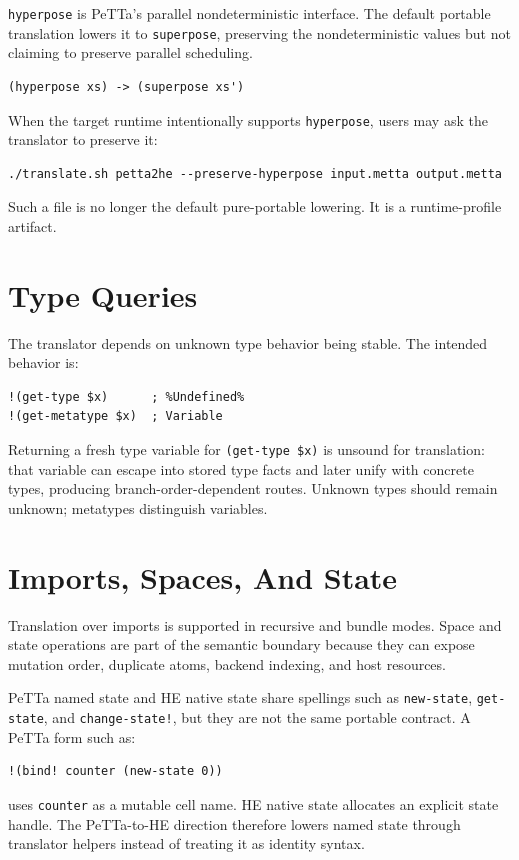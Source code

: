\documentclass[11pt]{article}
\newcommand{\code}[1]{\texttt{#1}}
\newcommand{\HE}{\textup{HE}}
\newcommand{\PeTTa}{\textup{PeTTa}}
\begin{document}
\code{hyperpose} is \PeTTa{}'s parallel nondeterministic interface.  The default
portable translation lowers it to \code{superpose}, preserving the
nondeterministic values but not claiming to preserve parallel scheduling.

\begin{lstlisting}
(hyperpose xs) -> (superpose xs')
\end{lstlisting}

When the target runtime intentionally supports \code{hyperpose}, users may ask
the translator to preserve it:

\begin{lstlisting}
./translate.sh petta2he --preserve-hyperpose input.metta output.metta
\end{lstlisting}

Such a file is no longer the default pure-portable lowering.  It is a
runtime-profile artifact.

\section{Type Queries}

The translator depends on unknown type behavior being stable.  The intended
behavior is:

\begin{lstlisting}
!(get-type $x)      ; %Undefined%
!(get-metatype $x)  ; Variable
\end{lstlisting}

Returning a fresh type variable for \code{(get-type \$x)} is unsound for
translation: that variable can escape into stored type facts and later unify
with concrete types, producing branch-order-dependent routes.  Unknown types
should remain unknown; metatypes distinguish variables.

\section{Imports, Spaces, And State}

Translation over imports is supported in recursive and bundle modes.  Space and
state operations are part of the semantic boundary because they can expose
mutation order, duplicate atoms, backend indexing, and host resources.

\PeTTa{} named state and \HE{} native state share spellings such as
\code{new-state}, \code{get-state}, and \code{change-state!}, but they are not
the same portable contract.  A \PeTTa{} form such as:
\begin{lstlisting}
!(bind! counter (new-state 0))
\end{lstlisting}
uses \code{counter} as a mutable cell name.  \HE{} native state allocates an
explicit state handle.  The \PeTTa{}-to-\HE{} direction therefore lowers named
state through translator helpers instead of treating it as identity syntax.
\end{document}
